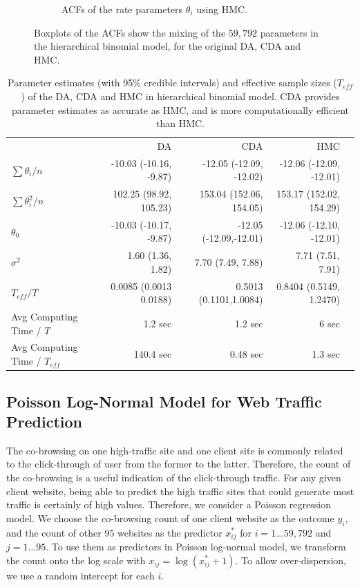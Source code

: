 \documentclass[10pt]{article}
\begin{document}
\begin{figure}[H]
\begin{subfigure}[b]{0.32\textwidth}
 \caption{ACFs of the rate parameters $\theta_i$ using HMC.}
 \end{subfigure} 
 \caption{Boxplots of the ACFs show the mixing of the $59,792$ parameters in the hierarchical binomial model, for the original DA\citep{polson2013bayesian}, CDA and HMC.}
 \label{data_binomial}
 \end{figure}
 
 
 
\begin{table}[H]
\centering
\begin{tabular}{|l |r |r| r| r |} 
 \hline
                          & DA & CDA & HMC\\
 [0.5ex]

 $ \sum \theta_i/n$      & -10.03 (-10.16, -9.87)& -12.05 (-12.09, -12.02) &  -12.06 (-12.09, -12.01)\\
 $ \sum \theta_i^2/n$      & 102.25 (98.92, 105.23)& 153.04 (152.06, 154.05) &  153.17 (152.02, 154.29)\\
$\theta_0$          & -10.03 (-10.17, -9.87)& -12.05 (-12.09,-12.01) &  -12.06 (-12.10, -12.01)\\
$\sigma^2$         & 1.60 (1.36, 1.82)&   7.70 (7.49, 7.88)  & 7.71 (7.51, 7.91)\\
$T_{eff} / T$ & 0.0085 (0.0013 0.0188) & 0.5013 (0.1101,1.0084) & 0.8404 (0.5149, 1.2470)\\
Avg Computing Time /  $T$  & 1.2 sec       & 1.2 sec        & 6 sec\\
Avg Computing Time /  $T_{eff}$  & 140.4 sec       & 0.48 sec        & 1.3 sec\\
 \hline
\end{tabular}
\caption{Parameter estimates (with 95\% credible intervals) and effective sample sizes ($T_{eff}$) of the DA, CDA and HMC in hierarchical binomial model. CDA provides parameter estimates as accurate as HMC, and is more computationally efficient than HMC.}
\label{tab:binomial}
\end{table}


\subsection{Poisson Log-Normal Model for Web Traffic Prediction}

The co-browsing on one high-traffic site and one client site is commonly related to the click-through of user from the former to the latter. Therefore, the count of the co-browsing is a useful indication of the click-through traffic. For any given client website, being able to predict the high traffic sites that could generate most traffic is certainly of high values. Therefore, we consider a Poisson regression model. We choose the co-browsing count of one client website as the outcome $y_i$, and the count of other $95$ websites as the predictor $x^*_{ij}$ for $i=1\ldots 59,792$ and $j=1\ldots 95$. To use them as predictors in Poisson log-normal model, we transform the count onto the log scale with $x_{ij}=\log (x^*_{ij}+1)$. To allow over-dispersion, we use a random intercept for each $i$.
\end{document}
